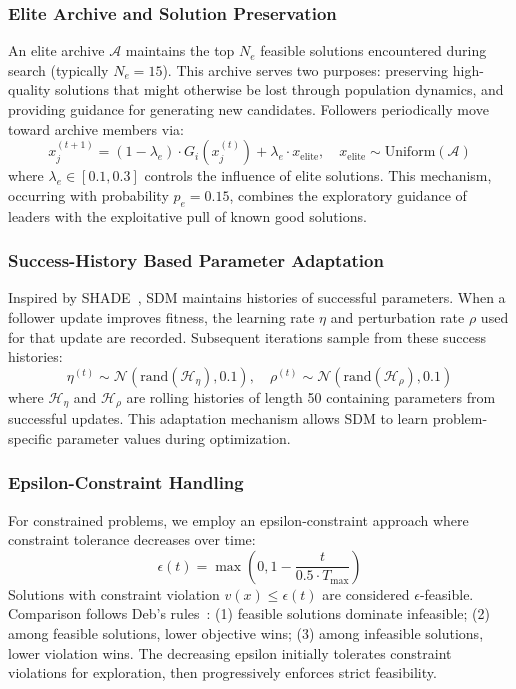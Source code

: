 \documentclass[11pt]{article}
\begin{document}
\subsubsection{Elite Archive and Solution Preservation}
An elite archive $\mathcal{A}$ maintains the top $N_e$ feasible solutions encountered during search (typically $N_e = 15$). This archive serves two purposes: preserving high-quality solutions that might otherwise be lost through population dynamics, and providing guidance for generating new candidates. Followers periodically move toward archive members via:
\begin{equation}
x_j^{(t+1)} = (1-\lambda_e) \cdot G_i(x_j^{(t)}) + \lambda_e \cdot x_{\text{elite}}, \quad x_{\text{elite}} \sim \text{Uniform}(\mathcal{A})
\end{equation}
where $\lambda_e \in [0.1, 0.3]$ controls the influence of elite solutions. This mechanism, occurring with probability $p_e = 0.15$, combines the exploratory guidance of leaders with the exploitative pull of known good solutions.

\subsubsection{Success-History Based Parameter Adaptation}
Inspired by SHADE~\citep{tanabe2013shade}, SDM maintains histories of successful parameters. When a follower update improves fitness, the learning rate $\eta$ and perturbation rate $\rho$ used for that update are recorded. Subsequent iterations sample from these success histories:
\begin{equation}
\eta^{(t)} \sim \mathcal{N}\left(\text{rand}(\mathcal{H}_\eta), 0.1\right), \quad \rho^{(t)} \sim \mathcal{N}\left(\text{rand}(\mathcal{H}_\rho), 0.1\right)
\end{equation}
where $\mathcal{H}_\eta$ and $\mathcal{H}_\rho$ are rolling histories of length 50 containing parameters from successful updates. This adaptation mechanism allows SDM to learn problem-specific parameter values during optimization.

\subsubsection{Epsilon-Constraint Handling}
For constrained problems, we employ an epsilon-constraint approach where constraint tolerance decreases over time:
\begin{equation}
\epsilon(t) = \max\left(0, 1 - \frac{t}{0.5 \cdot T_{\max}}\right)
\end{equation}
Solutions with constraint violation $v(x) \leq \epsilon(t)$ are considered $\epsilon$-feasible. Comparison follows Deb's rules~\citep{deb2000efficient}: (1) feasible solutions dominate infeasible; (2) among feasible solutions, lower objective wins; (3) among infeasible solutions, lower violation wins. The decreasing epsilon initially tolerates constraint violations for exploration, then progressively enforces strict feasibility.
\end{document}
